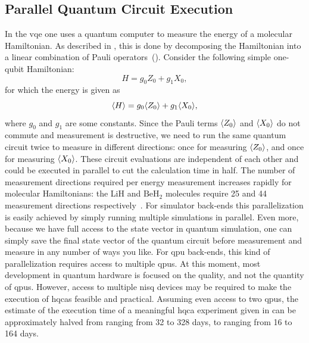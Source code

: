 \subsection{Parallel Quantum Circuit Execution} \label{sec:parallel-qpu}
In the \gls{vqe} one uses a quantum computer to measure the energy of a molecular Hamiltonian.
As described in , this is done by decomposing the Hamiltonian into a linear combination of Pauli operators~().
Consider the following simple one-qubit Hamiltonian:
\begin{equation}
H = g_0Z_0 + g_1X_0,
\end{equation}
for which the energy is given as
\begin{equation}
\langle{H}\rangle = g_0\langle{Z_0}\rangle + g_1\langle{X_0}\rangle,
\end{equation}
where $g_0$ and $g_1$ are some constants.
Since the Pauli terms $\langle{Z_0}\rangle$ and $\langle{X_0}\rangle$ do not commute and measurement is destructive, we need to run the same quantum circuit twice to measure in different directions: once for measuring $\langle{Z_0}\rangle$, and once for measuring $\langle{X_0}\rangle$.
These circuit evaluations are independent of each other and could be executed in parallel to cut the calculation time in half.
The number of measurement directions required per energy measurement increases rapidly for molecular Hamiltonians: the LiH and $\ensuremath{\mathrm{BeH_2}}$ molecules require 25 and 44 measurement directions respectively~\cite[Supplementary Information, Section III]{kandala2017hardware}.
For simulator back-ends this parallelization is easily achieved by simply running multiple simulations in parallel.
Even more, because we have full access to the state vector in quantum simulation, one can simply save the final state vector of the quantum circuit before measurement and measure in any number of ways you like.
For \gls{qpu} back-ends, this kind of parallelization requires access to multiple \glspl{qpu}.
At this moment, most development in quantum hardware is focused on the quality, and not the quantity of \glspl{qpu}.
However, access to multiple \gls{nisq} devices may be required to make the execution of \glspl{hqca} feasible and practical.
Assuming even access to two \glspl{qpu}, the estimate of the execution time of a meaningful \gls{hqca} experiment given in  can be approximately halved from ranging from 32 to 328 days, to ranging from 16 to 164 days.

